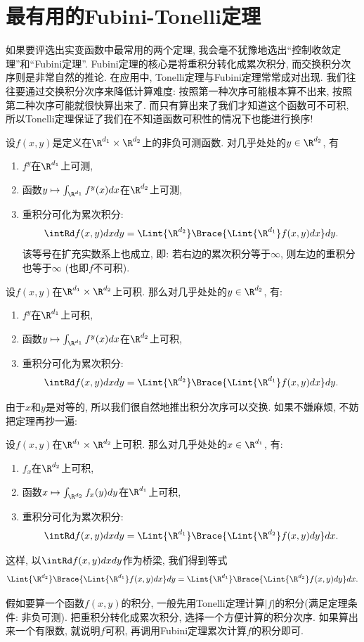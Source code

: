 \section{最有用的Fubini-Tonelli定理}
如果要评选出实变函数中最常用的两个定理, 我会毫不犹豫地选出“控制收敛定理”和“Fubini定理”. 
Fubini定理的核心是将重积分转化成累次积分, 而交换积分次序则是非常自然的推论. 
在应用中, Tonelli定理与Fubini定理常常成对出现. 我们往往要通过交换积分次序来降低计算难度: 按照第一种次序可能根本算不出来, 按照第二种次序可能就很快算出来了. 而只有算出来了我们才知道这个函数可不可积, 所以Tonelli定理保证了我们在不知道函数可积性的情况下也能进行换序! 
\begin{theorem}[Tonelli]
    设$f(x,y)$是定义在$\R^{d_1} \times \R^{d_2}$上的非负可测函数. 对几乎处处的$y \in \R^{d_2}$, 有
    \begin{enumerate}
    \item $f^y$在$\R^{d_1}$上可测, 
    \item 函数$y \mapsto \int_{\R^{d_1}} f^{y}(x)dx$在$\R^{d_2}$上可测,
    \item 重积分可化为累次积分:
    $$\intRd f(x,y)dxdy = \Lint{\R^{d_2}} \Brace{\Lint{\R^{d_1}}f(x,y)dx}dy.$$
    该等号在扩充实数系上也成立, 即: 若右边的累次积分等于$\infty$, 则左边的重积分也等于$\infty$ (也即$f$不可积). 
    \end{enumerate}
\end{theorem}
\begin{theorem}[Fubini]
    设$f(x,y)$在$\R^{d_1} \times \R^{d_2}$上可积. 那么对几乎处处的$y \in \R^{d_2}$, 有:
    \begin{enumerate}
    \item $f^y$在$\R^{d_1}$上可积,
    \item 函数$y \mapsto \int_{\R^{d_1}} f^{y}(x)dx$在$\R^{d_2}$上可积,
    \item 重积分可化为累次积分:
    $$\intRd f(x,y)dxdy = \Lint{\R^{d_2}} \Brace{\Lint{\R^{d_1}}f(x,y)dx}dy.$$
    \end{enumerate}
\end{theorem}
由于$x$和$y$是对等的, 所以我们很自然地推出积分次序可以交换. 如果不嫌麻烦, 不妨把定理再抄一遍:
\begin{theorem}[Fubini定理再抄一遍]
    设$f(x,y)$在$\R^{d_1} \times \R^{d_2}$上可积. 那么对几乎处处的$x \in \R^{d_1}$, 有:
    \begin{enumerate}
    \item $f_x$在$\R^{d_2}$上可积,
    \item 函数$x \mapsto \int_{\R^{d_2}} f_{x}(y)dy$在$\R^{d_1}$上可积,
    \item 重积分可化为累次积分:
    $$\intRd f(x,y)dxdy = \Lint{\R^{d_1}} \Brace{\Lint{\R^{d_2}}f(x,y)dy}dx.$$
    \end{enumerate}
\end{theorem}
这样, 以$\intRd f(x,y) dxdy$作为桥梁, 我们得到等式
$$\Lint{\R^{d_2}} \Brace{\Lint{\R^{d_1}}f(x,y)dx}dy
  =\Lint{\R^{d_1}} \Brace{\Lint{\R^{d_2}}f(x,y)dy}dx.$$
\begin{remark}
    假如要算一个函数$f(x,y)$的积分, 一般先用Tonelli定理计算$|f|$的积分(满足定理条件: 非负可测).
    把重积分转化成累次积分, 选择一个方便计算的积分次序. 
    如果算出来一个有限数, 就说明$f$可积, 再调用Fubini定理累次计算$f$的积分即可.
\end{remark}

